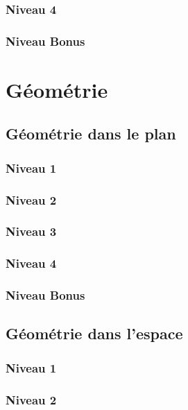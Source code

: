\documentclass[a4paper]{report}
\begin{document}
			\subsection{Niveau 4}
			
			\subsection{Niveau Bonus}
	
	\chapter{Géométrie}
	
		\section{Géométrie dans le plan}
		
			\subsection{Niveau 1}
		
			\subsection{Niveau 2}
		
			\subsection{Niveau 3}
			
			\subsection{Niveau 4}
			
			\subsection{Niveau Bonus}
	
		\section{Géométrie dans l'espace}
		
			\subsection{Niveau 1}
		
			\subsection{Niveau 2}
		
\end{document}
